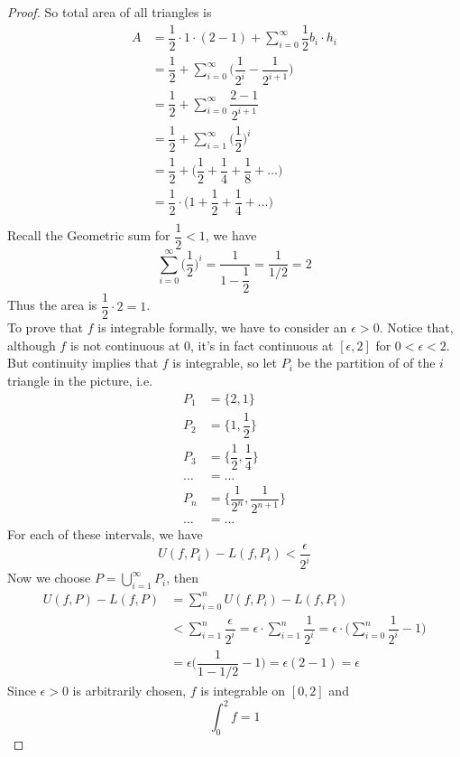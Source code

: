 \documentclass[10pt,letterpaper]{article}
\begin{document}
\begin{enumerate}[(a)]
\begin{proof}
		So total area of all triangles is
\begin{align*}
	A 
	&= \dfrac{1}{2} \cdot 1 \cdot (2 - 1) + \displaystyle\sum_{i=0}^{\infty} \dfrac{1}{2} b_i \cdot h_i \\
	&=  \dfrac{1}{2} + \displaystyle\sum_{i=0}^{\infty} \bigg(\dfrac{1}{2^{i}} - \dfrac{1}{2^{i+1}} \bigg)\\
	&=  \dfrac{1}{2} + \displaystyle\sum_{i=0}^{\infty} \dfrac{2 - 1}{2^{i+1}}\\ 
	&=  \dfrac{1}{2} + \displaystyle\sum_{i=1}^{\infty} \bigg(\dfrac{1}{2}\bigg)^i\\ 
	&=  \dfrac{1}{2} + \bigg(\dfrac{1}{2} + \dfrac{1}{4} + \dfrac{1}{8} + \ldots \bigg)\\
	&=  \dfrac{1}{2} \cdot \bigg(1 + \dfrac{1}{2} + \dfrac{1}{4} + \ldots \bigg)\\ 
\end{align*}		
	Recall the Geometric sum for $\dfrac{1}{2} < 1$, we have
	$$\displaystyle\sum_{i=0}^{\infty} \bigg(\dfrac{1}{2}\bigg)^i = \dfrac{1}{1 - \dfrac{1}{2}}
	= \dfrac{1}{1/2} = 2$$
	Thus the area is $\dfrac{1}{2} \cdot 2 = 1$. \\
	To prove that $f$ is integrable formally, we have to consider an $\epsilon > 0$. Notice 
	that, although $f$ is not continuous at $0$, it's in fact continuous at $[\epsilon, 2]$ 
	for $0 < \epsilon < 2$.
	But continuity implies that $f$ is integrable, so let $P_i$ be the partition of 
	of the $i$ triangle in the picture, i.e.
	\begin{align*}
		P_1 &= \{2, 1\} \\
		P_2 &= \{1, \dfrac{1}{2}\} \\
		P_3 &= \{\dfrac{1}{2}, \dfrac{1}{4}\} \\
		\ldots &= \ldots \\
		P_n &= \{\dfrac{1}{2^{n}}, \dfrac{1}{2^{n+1}}\} \\
		\ldots &= \ldots
	\end{align*}
	For each of these intervals, we have 
	$$U(f, P_i) - L(f, P_i) < \dfrac{\epsilon}{2^i}$$
	Now we choose $P = \displaystyle\bigcup_{i=1}^{\infty} P_i$, then
	\begin{align*}
	U(f, P) - L(f, P) &=\displaystyle\sum_{i=0}^{n} U(f, P_i) - L(f, P_i) \\
	&< \displaystyle\sum_{i=1}^{n} \dfrac{\epsilon}{2^i} 
	= \epsilon \cdot \displaystyle\sum_{i=1}^{n} \dfrac{1}{2^i} 
	=  \epsilon \cdot \bigg(\displaystyle\sum_{i=0}^{n} \dfrac{1}{2^i} - 1\bigg)  \\
	&=  \epsilon \bigg( \dfrac{1}{1 - 1/2}  - 1 \bigg) 
	=  \epsilon (2 - 1) = \epsilon 
	\end{align*}
	Since $\epsilon > 0$ is arbitrarily chosen, $f$ is integrable on $[0, 2]$ and 
	$$\displaystyle\int_{0}^{2} f = 1$$


		\end{proof}						
	\end{enumerate}
	
\end{document}
